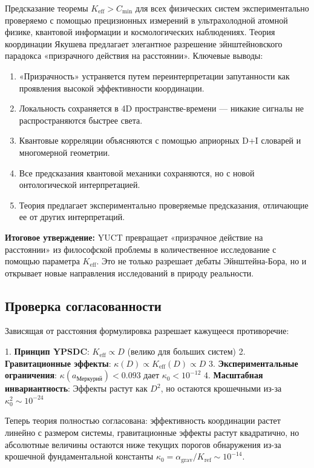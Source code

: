 \documentclass[11pt,a4paper]{article}
\begin{document}
	Предсказание теоремы $K_{\mathrm{eff}} > C_{\min}$ для всех физических систем экспериментально проверяемо с помощью прецизионных измерений в ультрахолодной атомной физике, квантовой информации и космологических наблюдениях.
	Теория координации Якушева предлагает элегантное разрешение эйнштейновского парадокса «призрачного действия на расстоянии». Ключевые выводы:
	
	\begin{enumerate}
		\item «Призрачность» устраняется путем переинтерпретации запутанности как проявления высокой эффективности координации.
		
		\item Локальность сохраняется в 4D пространстве-времени — никакие сигналы не распространяются быстрее света.
		
		\item Квантовые корреляции объясняются с помощью априорных D+I словарей и многомерной геометрии.
		
		\item Все предсказания квантовой механики сохраняются, но с новой онтологической интерпретацией.
		
		\item Теория предлагает экспериментально проверяемые предсказания, отличающие ее от других интерпретаций.
	\end{enumerate}
	
	\textbf{Итоговое утверждение:} YUCT превращает «призрачное действие на расстоянии» из философской проблемы в количественное исследование с помощью параметра $K_{\mathrm{eff}}$. Это не только разрешает дебаты Эйнштейна-Бора, но и открывает новые направления исследований в природу реальности.
	\subsection{Проверка согласованности}
	
	Зависящая от расстояния формулировка разрешает кажущееся противоречие:
	
	1. \textbf{Принцип YPSDC}: $K_{\mathrm{eff}} \propto D$ (велико для больших систем)
	2. \textbf{Гравитационные эффекты}: $\kappa(D) \propto K_{\mathrm{eff}}(D) \propto D$
	3. \textbf{Экспериментальные ограничения}: $\kappa(a_{\text{Меркурий}}) < 0.093$ дает $\kappa_0 < 10^{-12}$
	4. \textbf{Масштабная инвариантность}: Эффекты растут как $D^2$, но остаются крошечными из-за $\kappa_0^2 \sim 10^{-24}$
	
	Теперь теория полностью согласована: эффективность координации растет линейно с 
	размером системы, гравитационные эффекты растут квадратично, но абсолютные величины 
	остаются ниже текущих порогов обнаружения из-за крошечной фундаментальной константы 
	$\kappa_0 = \alpha_{\text{grav}}/K_{\text{ref}} \sim 10^{-14}$.
\end{document}
